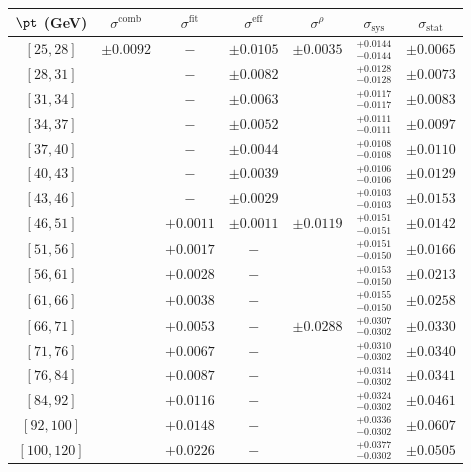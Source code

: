 \begin{tabular}{c||c|c|c|c||c|c}
$\pt$ (GeV) & $\sigma^{\text{comb}}$ & $\sigma^{\text{fit}}$ & $\sigma^{\text{eff}}$ & $\sigma^\rho$ & $\sigma_{\text{sys}}$ & $\sigma_{\text{stat}}$ \\
\hline
$[25, 28]$ & \multirow{17}{*}{$\pm0.0092$} & $-$ & $\pm0.0105$ & \multirow{7}{*}{$\pm0.0035$} & $^{+0.0144}_{-0.0144}$ & $\pm0.0065$\\
$[28, 31]$ &  & $-$ & $\pm0.0082$ &  & $^{+0.0128}_{-0.0128}$ & $\pm0.0073$\\
$[31, 34]$ &  & $-$ & $\pm0.0063$ &  & $^{+0.0117}_{-0.0117}$ & $\pm0.0083$\\
$[34, 37]$ &  & $-$ & $\pm0.0052$ &  & $^{+0.0111}_{-0.0111}$ & $\pm0.0097$\\
$[37, 40]$ &  & $-$ & $\pm0.0044$ &  & $^{+0.0108}_{-0.0108}$ & $\pm0.0110$\\
$[40, 43]$ &  & $-$ & $\pm0.0039$ &  & $^{+0.0106}_{-0.0106}$ & $\pm0.0129$\\
$[43, 46]$ &  & $-$ & $\pm0.0029$ &  & $^{+0.0103}_{-0.0103}$ & $\pm0.0153$\\\cline{5-5}
$[46, 51]$ &  & $+0.0011$ & $\pm0.0011$ & \multirow{4}{*}{$\pm0.0119$} & $^{+0.0151}_{-0.0151}$ & $\pm0.0142$\\
$[51, 56]$ &  & $+0.0017$ & $-$ &  & $^{+0.0151}_{-0.0150}$ & $\pm0.0166$\\
$[56, 61]$ &  & $+0.0028$ & $-$ &  & $^{+0.0153}_{-0.0150}$ & $\pm0.0213$\\
$[61, 66]$ &  & $+0.0038$ & $-$ &  & $^{+0.0155}_{-0.0150}$ & $\pm0.0258$\\\cline{5-5}
$[66, 71]$ &  & $+0.0053$ & $-$ & \multirow{6}{*}{$\pm0.0288$} & $^{+0.0307}_{-0.0302}$ & $\pm0.0330$\\
$[71, 76]$ &  & $+0.0067$ & $-$ &  & $^{+0.0310}_{-0.0302}$ & $\pm0.0340$\\
$[76, 84]$ &  & $+0.0087$ & $-$ &  & $^{+0.0314}_{-0.0302}$ & $\pm0.0341$\\
$[84, 92]$ &  & $+0.0116$ & $-$ &  & $^{+0.0324}_{-0.0302}$ & $\pm0.0461$\\
$[92, 100]$ &  & $+0.0148$ & $-$ &  & $^{+0.0336}_{-0.0302}$ & $\pm0.0607$\\
$[100, 120]$ &  & $+0.0226$ & $-$ &  & $^{+0.0377}_{-0.0302}$ & $\pm0.0505$\\
\end{tabular}
